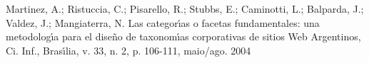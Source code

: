 \documentclass[
12pt,		%
openright,	%
twoside,  %
a4paper,			%
chapter=TITLE,		%
english,			%
french,				%
spanish,			%
brazil				%
]{USPSC-classe/USPSC}
\begin{document}
\begin{flushleft}
\begin{flushleft}
\begin{flushleft}
\begin{flushleft}
\begin{flushleft}
\begin{flushleft}
\begin{flushleft}
\begin{flushleft}
\begin{flushleft}
\begin{flushleft}
\begin{flushleft}
\begin{flushleft}
\begin{flushleft}
\begin{flushleft}
\begin{flushleft}
\begin{flushleft}
\begin{flushleft}
[MARTINEZ et al., 2004] Martinez, A.; Ristuccia, C.; Pisarello, R.; Stubbs, E.; Caminotti, L.; Balparda, J.; Valdez, J.; Mangiaterra, N. Las categor\'{\i}as o facetas fundamentales: una metodolog\'{\i}a para el diseño de taxonom\'{\i}as corporativas de sitios Web Argentinos, Ci. Inf., Bras\'{\i}lia, v. 33, n. 2, p. 106-111, maio/ago. 2004
\end{flushleft}


\end{flushleft}


\end{flushleft}


\end{flushleft}


\end{flushleft}


\end{flushleft}


\end{flushleft}


\end{flushleft}


\end{flushleft}


\end{flushleft}


\end{flushleft}


\end{flushleft}


\end{flushleft}


\end{flushleft}


\end{flushleft}


\end{flushleft}


\end{flushleft}
\end{document}
